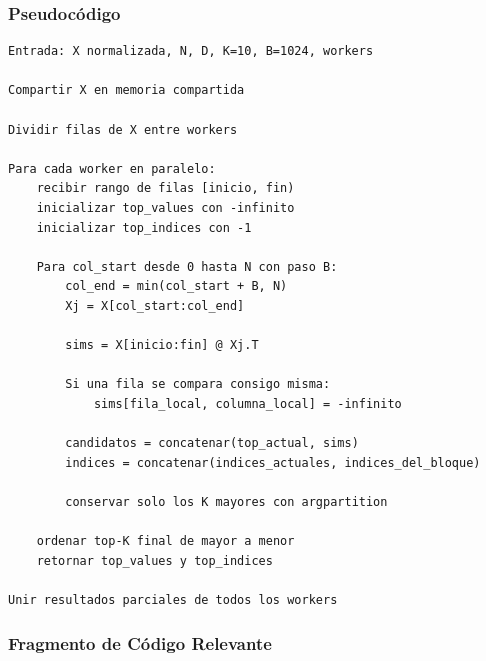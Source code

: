 \documentclass[10pt,a4paper]{article}
\begin{document}
\subsubsection{Pseudoc\'odigo}

\begin{lstlisting}[caption={Pseudoc\'odigo de la estrategia por bloques.}]
Entrada: X normalizada, N, D, K=10, B=1024, workers

Compartir X en memoria compartida

Dividir filas de X entre workers

Para cada worker en paralelo:
    recibir rango de filas [inicio, fin)
    inicializar top_values con -infinito
    inicializar top_indices con -1

    Para col_start desde 0 hasta N con paso B:
        col_end = min(col_start + B, N)
        Xj = X[col_start:col_end]

        sims = X[inicio:fin] @ Xj.T

        Si una fila se compara consigo misma:
            sims[fila_local, columna_local] = -infinito

        candidatos = concatenar(top_actual, sims)
        indices = concatenar(indices_actuales, indices_del_bloque)

        conservar solo los K mayores con argpartition

    ordenar top-K final de mayor a menor
    retornar top_values y top_indices

Unir resultados parciales de todos los workers
\end{lstlisting}

\subsubsection{Fragmento de C\'odigo Relevante}
\end{document}
